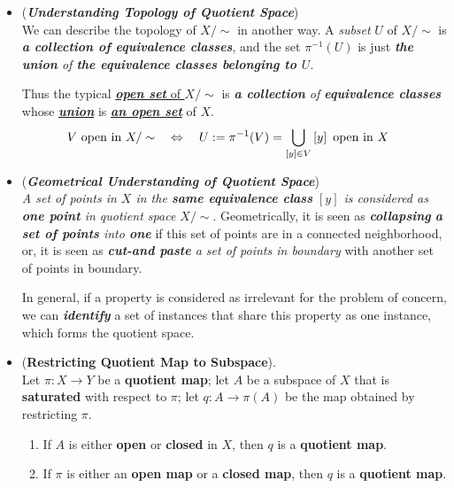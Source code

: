 \documentclass[11pt]{article}
\begin{document}
\begin{itemize}
\item \begin{remark} (\emph{\textbf{Understanding Topology of Quotient Space}})\\
We can describe the topology of $X/\sim$ in another way. A \emph{subset} $U$ of $X/\sim$ is \emph{\textbf{a collection of equivalence classes}}, and the set $\pi^{-1}(U)$ is just \emph{\textbf{the union} of \textbf{the equivalence classes belonging to $U$}}. 

Thus the typical \underline{\emph{\textbf{open set}} of $X/\sim$} is \emph{\textbf{a collection} of \textbf{equivalence classes}} whose \underline{\emph{\textbf{union}}} is \underline{\emph{\textbf{an open set}}} of $X$.
\begin{align*}
V \text{ open in } X/\sim \quad &\Leftrightarrow \quad U:=\pi^{-1}(V) = \bigcup_{[y] \in V}\left[y\right] \text{ open in } X
\end{align*}
\end{remark}

\item \begin{remark} (\emph{\textbf{Geometrical Understanding of Quotient Space}})\\
\emph{A set of points in $X$ in the \textbf{same equivalence class} $[y]$  is considered as \textbf{one point} in quotient space $X/\sim$}. Geometrically, it is seen as \emph{\textbf{collapsing} \textbf{a set of points} into \textbf{one}} if this set of points are in a connected neighborhood, or, it is seen as \emph{\textbf{cut-and paste} a set of points in boundary} with another set of points in boundary.

In general, if a property is considered as irrelevant for the problem of concern,  we can \emph{\textbf{identify}} a set of instances that share this property as one instance, which forms the quotient space.
\end{remark}

\item \begin{proposition} (\textbf{Restricting Quotient Map to Subspace}). \citep{munkres2000topology}\\
Let $\pi : X \rightarrow Y$ be a \textbf{quotient map}; let $A$ be a subspace of $X$ that is \textbf{saturated} with respect to $\pi$; let $q : A \rightarrow \pi(A)$ be the map obtained by restricting $\pi$.
\begin{enumerate}
\item If $A$ is either \textbf{open} or \textbf{closed} in $X$, then $q$ is a \textbf{quotient map}.
\item If $\pi$ is either an \textbf{open map} or a \textbf{closed map}, then $q$ is a \textbf{quotient map}.
\end{enumerate}
\end{proposition}


\end{itemize}
\end{document}
